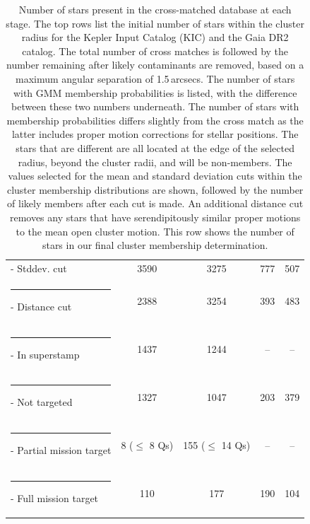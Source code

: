 \begin{table}[p]
\begin{tabular}{lcccc}
         - Stddev. cut & 3590 & 3275 & 777 & 507 \\\rule{-3pt}{1.2em}
         - Distance cut & 2388 & 3254 & 393 & 483 \\\rule{-3pt}{1.2em}
         - In superstamp & 1437 & 1244 & -- & -- \\\rule{-3pt}{1.2em}
         - Not targeted & 1327 & 1047 & 203 & 379 \\\rule{-3pt}{1.2em}
         - Partial mission target & 8 ($\leq$ 8 Qs) & 155 ($\leq$ 14 Qs) & -- & -- \\\rule{-3pt}{1.2em}
         - Full mission target & 110 & 177 & 190 & 104 \\
        \bottomrule
    \end{tabular}
    \caption[Number of stars present in the cross-matched database at each stage]{Number of stars present in the cross-matched database at each stage. The top rows list the initial number of stars within the cluster radius for the Kepler Input Catalog (KIC) and the Gaia DR2 catalog. The total number of cross matches is followed by the number remaining after likely contaminants are removed, based on a maximum angular separation of 1.5\,arcsecs. The number of stars with GMM membership probabilities is listed, with the difference between these two numbers underneath. The number of stars with membership probabilities differs slightly from the cross match as the latter includes proper motion corrections for stellar positions. The stars that are different are all located at the edge of the selected radius, beyond the cluster radii, and will be non-members. The values selected for the mean and standard deviation cuts within the cluster membership distributions are shown, followed by the number of likely members after each cut is made. An additional distance cut removes any stars that have serendipitously similar proper motions to the mean open cluster motion. This row shows the number of stars in our final cluster membership determination.}
    \label{tab:cluster_crossmatch}
\end{table}



